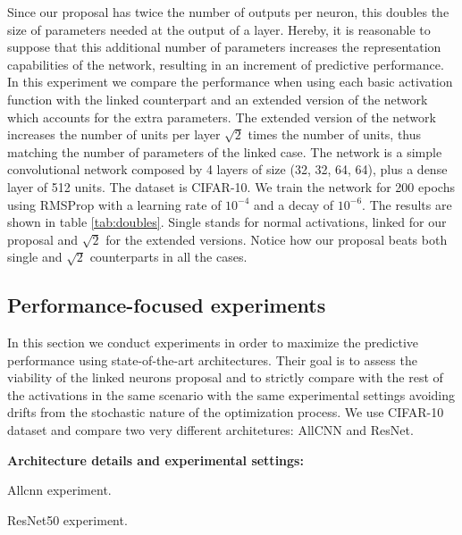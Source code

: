 \documentclass[10pt,twocolumn,letterpaper]{article}
\begin{document}
Since our proposal has twice the number of outputs per neuron, this doubles the size of parameters needed at the output of a layer. Hereby, it is reasonable to suppose that this additional number of parameters increases the representation capabilities of the network, resulting in an increment of predictive performance. In this experiment we compare the performance when using each basic activation function with the linked counterpart and an extended version of the network which accounts for the extra parameters. The extended version of the network increases the number of units per layer $\sqrt{2}$ times the number of units, thus matching the number of parameters of the linked case. The network is a simple convolutional network composed by 4 layers of size (32, 32, 64, 64), plus a dense layer of 512 units. The dataset is CIFAR-10. We train the network for 200 epochs using RMSProp \cite{rmsprop} with a learning rate of $10^{-4}$ and a decay of $10^{-6}$. The results are shown in table \ref{tab:doubles}. Single stands for normal activations, linked for our proposal and  $\sqrt{2}$ for the extended versions. Notice how our proposal beats both single and  $\sqrt{2}$ counterparts in all the cases.

\subsection{Performance-focused experiments}

In this section we conduct experiments in order to maximize the predictive performance using state-of-the-art architectures. Their goal is to assess the viability of the linked neurons proposal and to strictly compare with the rest of the activations in the same scenario with the same experimental settings avoiding drifts from the stochastic nature of the optimization process. We use CIFAR-10 dataset and compare two very different architetures: AllCNN\cite{allcnn} and ResNet\cite{resnet}.

{\bf Architecture details and experimental settings:}
\begin{table}[h]
    \centering
    
    
    
    \caption{Allcnn experiment.}
    \label{tab:allcnn}
\end{table}

\begin{table}[h]
    \centering
    
    
    
    \caption{ResNet50 experiment.}
    \label{tab:resnet50}
\end{table}
\end{document}
